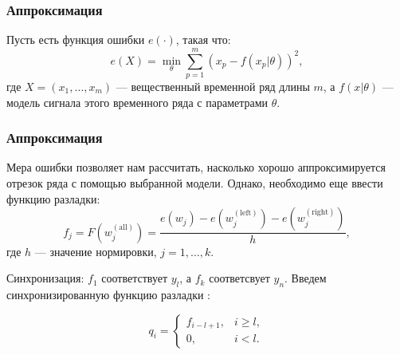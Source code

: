 \documentclass[intlimits, 9pt, unicode]{beamer}
\begin{document}
\begin{frame}
    \frametitle{Аппроксимация}

Пусть есть функция ошибки $e(\cdot)$, такая что:
\begin{equation*}
e(X) = \min_{\theta}{\sum_{p=1}^m(x_p - f(x_p | \theta))^2 },
\end{equation*}
где $X = (x_1, \dots, x_m)$ ---  вещественный временной ряд длины $m$, а $f(x | \theta)$ --- модель сигнала этого временного ряда с параметрами $\theta$.


\end{frame}

\begin{frame}
    \frametitle{Аппроксимация}

Мера ошибки позволяет нам рассчитать, насколько хорошо аппроксимируется отрезок ряда с помощью выбранной модели. Однако, необходимо еще ввести функцию разладки:
\begin{equation*}
f_j = F(w_j^{\mathrm{(all)}} ) = \frac{e(w_j) - e(w_j^{\mathrm{(left)}}) - e(w_j^{\mathrm{(right)}})}{h}, 
\end{equation*}
где $h$ --- значение нормировки, $j = 1, \dots, k$.

Синхронизация: $f_1$ соответствует $y_l$, а $f_k $ соответсвует $y_n$. Введем синхронизированную функцию разладки :

\begin{equation*}
q_i =
	\begin{cases}
		f_{i-l+1}, & i \geq l, \\
		0, & i < l.
	\end{cases}
\end{equation*}


\end{frame}
\end{document}
